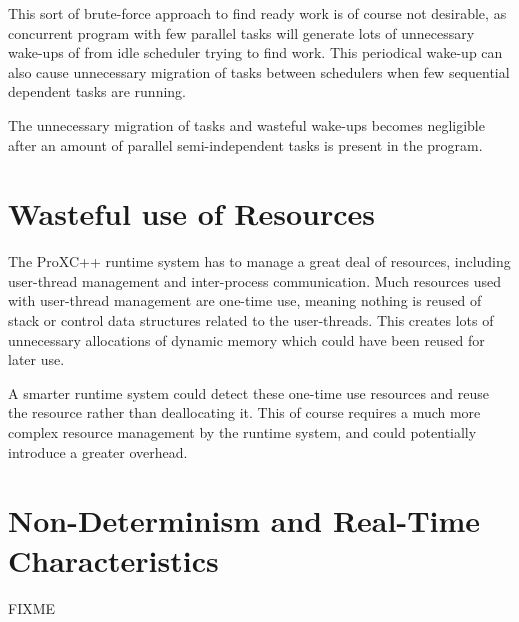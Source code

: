 This sort of brute\hyp{}force approach to find ready work is of course not desirable, as concurrent program with few parallel tasks will generate lots of unnecessary wake\hyp{}ups of from idle scheduler trying to find work. This periodical wake\hyp{}up can also cause unnecessary migration of tasks between schedulers when few sequential dependent tasks are running. 

The unnecessary migration of tasks and wasteful wake\hyp{}ups becomes negligible after an amount of parallel semi\hyp{}independent tasks is present in the program.


\section{Wasteful use of Resources}

The ProXC++ runtime system has to manage a great deal of resources, including user\hyp{}thread management and inter\hyp{}process communication. Much resources used with user\hyp{}thread management are one\hyp{}time use, meaning nothing is reused of stack or control data structures related to the user\hyp{}threads. This creates lots of unnecessary allocations of dynamic memory which could have been reused for later use.

A smarter runtime system could detect these one\hyp{}time use resources and reuse the resource rather than deallocating it. This of course requires a much more complex resource management by the runtime system, and could potentially introduce a greater overhead.


\section{Non\hyp{}Determinism and Real\hyp{}Time Characteristics}

FIXME
